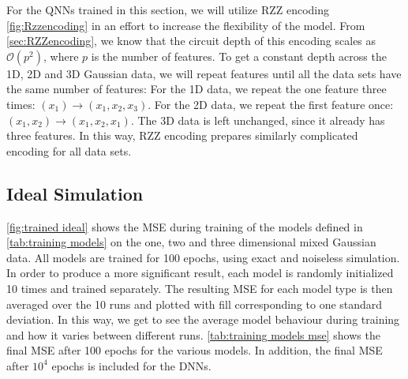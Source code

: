 For the QNNs trained in this section, we will utilize RZZ encoding \autoref{fig:Rzzencoding} in an effort to increase the flexibility of the model. From \autoref{sec:RZZencoding}, we know that the circuit depth of this encoding scales as $\mathcal{O}(p^2)$, where $p$ is the number of features. To get a constant depth across the 1D, 2D and 3D Gaussian data, we will repeat features until all the data sets have the same number of features: For the 1D data, we repeat the one feature three times: $(x_1) \rightarrow (x_1, x_2, x_3)$. For the 2D data, we repeat the first feature once: $(x_1, x_2) \rightarrow (x_1, x_2, x_1)$. The 3D data is left unchanged, since it already has three features. In this way, RZZ encoding prepares similarly complicated encoding for all data sets. 


\subsection{Ideal Simulation}\label{sec:Ideal Simulation}
\autoref{fig:trained ideal} shows the MSE during training of the models defined in \autoref{tab:training models} on the one, two and three dimensional mixed Gaussian data. All models are trained for 100 epochs, using exact and noiseless simulation. In order to produce a more significant result, each model is randomly initialized 10 times and trained separately. The resulting MSE for each model type is then averaged over the 10 runs and plotted with fill corresponding to one standard deviation. In this way, we get to see the average model behaviour during training and how it varies between different runs. \autoref{tab:training models mse} shows the final MSE after 100 epochs for the various models. In addition, the final MSE after $10^4$ epochs is included for the DNNs.   

